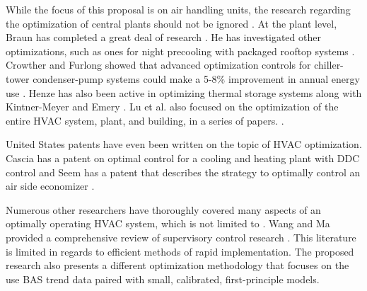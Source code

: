 While the focus of this proposal is on air handling units, the research
regarding the optimization of central plants should not be ignored
\cite{Ahn2001, Yu2008OptimizingChillers}. At the plant level, Braun has
completed a great deal of research \cite{braun1990, Braun2007RP1252,
Braun2007HybridCooling, Braun2007GeneralControl}. He has investigated
other optimizations, such as ones for night precooling with packaged
rooftop systems \cite{Braun2005}. Crowther and Furlong showed that
advanced optimization controls for chiller-tower condenser-pump systems
could make a 5-8\% improvement in annual energy use
\cite{Crowther2004}. Henze has also been active in
optimizing thermal storage systems \cite{Henze2005} along with
Kintner-Meyer and Emery \cite{KintnerMeyer1995}. Lu et al. also focused
on the optimization of the entire HVAC system, plant, and building, in a
series of papers. \cite{LuLu2004, LuLu2005Part1, LuLu2005Part2,
LuLu2005HVACSystemOptimization}. 

United States patents have even been written on the topic of HVAC
optimization. Cascia has a patent on optimal control for a cooling and
heating plant with DDC control \cite{Cascia1999} and Seem has a patent
that describes the strategy to optimally control an air side economizer
\cite{Seem2002}. 

Numerous other researchers have thoroughly covered many aspects of an
optimally operating HVAC system, which is not limited to
\cite{Gruber2014AlternativeBuildings,Cho2009Single-ductOptimization,Nassif2005,Zaheer-uddin2000OptimalBuildings,Wang2000Model-basedAlgorithm,Henze2003EvaluationSystems,Liu2006ExperimentalFoundation,
Zheng1996,
Ning2010Neuro-optimalSystem,Atthajariyakul2004,Cui2004,XuXinhua2009,SunZhongwei2011,Mumma1997EnergyControl,Mossolly-Ghali-Ghaddar_2009_Energy}.
Wang and Ma provided a comprehensive review of supervisory control
research \cite{Wang2008}. This literature is limited in
regards to efficient methods of rapid implementation. The proposed
research also presents a different optimization methodology that focuses
on the use BAS trend data paired with small, calibrated, first-principle
models. 











